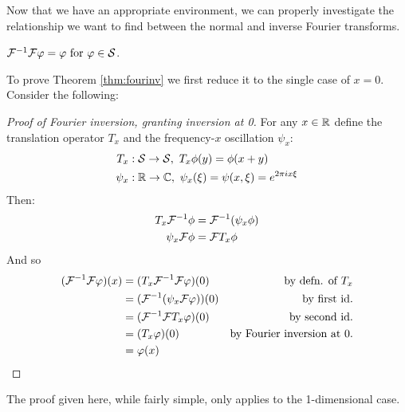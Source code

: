   Now that we have an appropriate environment, we can properly investigate the relationship we want to find between the normal and inverse Fourier transforms.
  \begin{thm}
    \label{thm:fourinv}
    $\mathcal{F}^{-1}\mathcal{F} \varphi = \varphi \text{ for } \varphi\in\mathcal{S}$.
  \end{thm}
  To prove Theorem \ref{thm:fourinv} we first reduce it to the single case of $x=0$.
  Consider the following:
  \begin{proof}[Proof of Fourier inversion, granting inversion at 0]
    For any $x\in\mathbb{R}$ define the translation operator $T_x$ and the frequency-$x$ oscillation $\psi_x$:
    \begin{align*}
      T_x&:\mathcal{S}\rightarrow\mathcal{S},\ T_x\phi(y) = \phi(x+y)\\
      \psi_x&:\mathbb{R}\rightarrow\mathbb{C},\ \psi_x(\xi) = \psi(x,\xi) = e^{2\pi i x \xi}
    \end{align*}
    Then: 
    \begin{align*}
      T_x\mathcal{F}^{-1}\phi &= \mathcal{F}^{-1}(\psi_x\phi)\\
      \psi_x\mathcal{F}\phi &= \mathcal{F} T_x\phi
    \end{align*}
    And so
    \begin{align*}
      (\mathcal{F}^{-1}\mathcal{F}\varphi)(x) &= (T_x\mathcal{F}^{-1}\mathcal{F}\varphi)(0) &\text{by defn. of $T_x$}\\
      &= (\mathcal{F}^{-1}(\psi_x\mathcal{F}\varphi))(0) &\text{by first id.}\\
      &= (\mathcal{F}^{-1}\mathcal{F} T_x\varphi)(0)  &\text{by second id.}\\
      &= (T_x\varphi)(0) &\text{by Fourier inversion at 0.}\\
      &= \varphi(x)&\qedhere
    \end{align*}
  \end{proof}

  \begin{rmk}
    The proof given here, while fairly simple, only applies to the 1-dimensional case. 
  \end{rmk}
